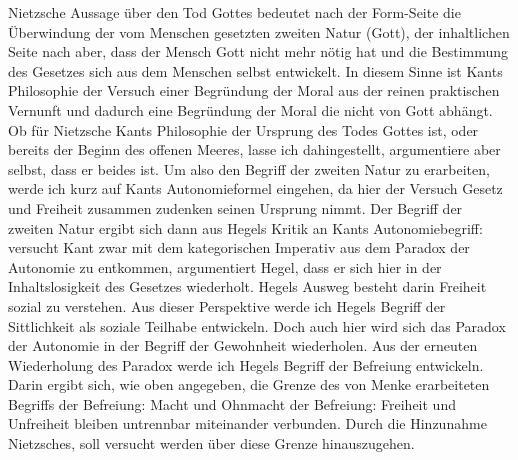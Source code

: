 \documentclass[12pt, a4paper, openany]{report}
\begin{document}
Nietzsche Aussage über den Tod Gottes bedeutet nach der Form-Seite die Überwindung der vom Menschen gesetzten zweiten Natur (Gott), der inhaltlichen Seite nach aber, dass der Mensch Gott nicht mehr nötig hat und die Bestimmung des Gesetzes sich aus dem Menschen selbst entwickelt. 
In diesem Sinne ist Kants Philosophie der Versuch einer Begründung der Moral aus der reinen praktischen Vernunft und dadurch eine Begründung der Moral die nicht von Gott abhängt. 
Ob für Nietzsche Kants Philosophie der Ursprung des Todes Gottes ist, oder bereits der Beginn des offenen Meeres, lasse ich dahingestellt, argumentiere aber selbst, dass er beides ist.
Um also den Begriff der zweiten Natur zu erarbeiten, werde ich kurz auf Kants Autonomieformel eingehen, da hier der Versuch Gesetz und Freiheit zusammen zudenken seinen Ursprung nimmt. 
Der Begriff der zweiten Natur ergibt sich dann aus Hegels Kritik an Kants Autonomiebegriff:
versucht Kant zwar mit dem kategorischen Imperativ aus dem Paradox der Autonomie zu entkommen, argumentiert Hegel, dass er sich hier in der Inhaltslosigkeit des Gesetzes wiederholt.
Hegels Ausweg besteht darin Freiheit sozial zu verstehen. 
Aus dieser Perspektive werde ich Hegels Begriff der Sittlichkeit als soziale Teilhabe entwickeln.
Doch auch hier wird sich das Paradox der Autonomie in der Begriff der Gewohnheit wiederholen.
Aus der erneuten Wiederholung des Paradox werde ich Hegels Begriff der Befreiung entwickeln.
Darin ergibt sich, wie oben angegeben, die Grenze des von Menke erarbeiteten Begriffs der Befreiung:
Macht und Ohnmacht der Befreiung: Freiheit und Unfreiheit bleiben untrennbar miteinander verbunden.
Durch die Hinzunahme Nietzsches, soll versucht werden über diese Grenze hinauszugehen.\\
\end{document}
